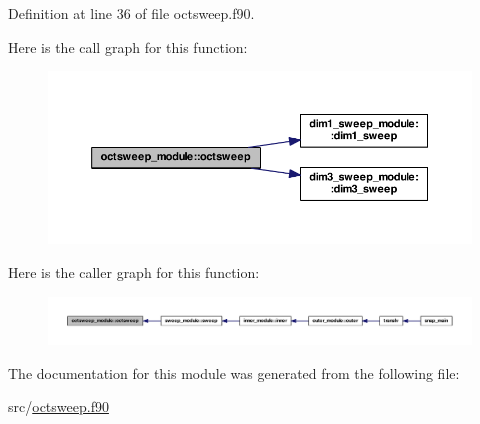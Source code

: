 Definition at line 36 of file octsweep.\-f90.



Here is the call graph for this function\-:\nopagebreak
\begin{figure}[H]
\begin{center}
\leavevmode
\includegraphics[width=350pt]{classoctsweep__module_af58dfb8973e3755aeeaa82bae73d2aef_cgraph}
\end{center}
\end{figure}




Here is the caller graph for this function\-:\nopagebreak
\begin{figure}[H]
\begin{center}
\leavevmode
\includegraphics[width=350pt]{classoctsweep__module_af58dfb8973e3755aeeaa82bae73d2aef_icgraph}
\end{center}
\end{figure}




The documentation for this module was generated from the following file\-:\begin{DoxyCompactItemize}
\item 
src/\hyperlink{octsweep_8f90}{octsweep.\-f90}\end{DoxyCompactItemize}
